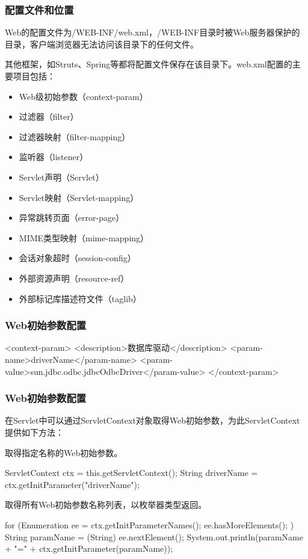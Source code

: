 \begin{frame}[fragile] %
\frametitle{配置文件和位置} 

Web的配置文件为/WEB-INF/web.xml，/WEB-INF目录时被Web服务器保护的目录，客户端浏览器无法访问该目录下的任何文件。

其他框架，如Struts、Spring等都将配置文件保存在该目录下。web.xml配置的主要项目包括：

\begin{itemize}\kai
\item Web级初始参数（context-param）
\item 过滤器（filter）
\item 过滤器映射（filter-mapping）
\item 监听器（listener）
\item Servlet声明（Servlet）
\item Servlet映射（Servlet-mapping）
\item 异常跳转页面（error-page）
\item MIME类型映射（mime-mapping）
\item 会话对象超时（session-config）
\item 外部资源声明（resource-ref）
\item 外部标记库描述符文件（taglib）
\end{itemize}
\end{frame}

\begin{frame}[fragile] %
\frametitle{Web初始参数配置} 


\begin{xmlCode}
<context-param>
  <description>数据库驱动</description>
  <param-name>driverName</param-name>
  <param-value>sun.jdbc.odbc.jdbcOdbcDriver</param-value>
</context-param>
\end{xmlCode}
\end{frame}

\begin{frame}[fragile] %
\frametitle{Web初始参数配置} 


在Servlet中可以通过ServletContext对象取得Web初始参数，为此ServletContext提供如下方法：

 取得指定名称的Web初始参数。

\begin{javaCode}
ServletContext ctx = this.getServletContext();
String driverName = ctx.getInitParameter("driverName");  
\end{javaCode}

 取得所有Web初始参数名称列表，以枚举器类型返回。

\begin{javaCode}
for (Enumeration ee = ctx.getInitParameterNames(); ee.hasMoreElements(); ) {
  String paramName = (String) ee.nextElement();
  System.out.println(paramName + "="  + ctx.getInitParameter(paramName));
}
\end{javaCode}
\end{frame}

